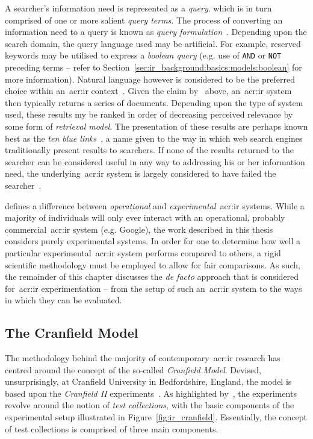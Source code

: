 A searcher's information need is represented as a \emph{query}. which is in turn comprised of one or more salient \emph{query terms}. The process of converting an information need to a query is known as \emph{query formulation}~\citep{hiemstra2009ir_models}. Depending upon the search domain, the query language used may be artificial. For example, reserved keywords may be utilised to express a \emph{boolean query} (e.g. use of \texttt{AND} or \texttt{NOT} preceding terms -- refer to Section~\ref{sec:ir_background:basics:models:boolean} for more information). Natural language however is considered to be the preferred choice within an~\gls{acr:ir} context~\citep{rijsbergen1979ir}. Given the claim by~\cite{robertson1977prp} above, an~\gls{acr:ir} system then typically returns a series of documents. Depending upon the type of system used, these results my be ranked in order of decreasing perceived relevance by some form of \emph{retrieval model}. The presentation of these results are perhaps known best as the \emph{ten blue links}~\citep{hearst2009_search}, a name given to the way in which web search engines traditionally present results to searchers. If none of the results returned to the searcher can be considered useful in any way to addressing his or her information need, the underlying~\gls{acr:ir} system is largely considered to have failed the searcher~\citep{rijsbergen1979ir}.

\cite{rijsbergen1979ir} defines a difference between \emph{operational} and \emph{experimental}~\gls{acr:ir} systems. While a majority of individuals will only ever interact with an operational, probably commercial~\gls{acr:ir} system (e.g. Google), the work described in this thesis considers purely experimental systems. In order for one to determine how well a particular experimental~\gls{acr:ir} system performs compared to others, a rigid scientific methodology must be employed to allow for fair comparisons. As such, the remainder of this chapter discusses the \emph{de facto} approach that is considered for~\gls{acr:ir} experimentation -- from the setup of such an~\gls{acr:ir} system to the ways in which they can be evaluated.

\subsection{The Cranfield Model}\label{sec:ir_background:basics:cranfield}
The methodology behind the majority of contemporary~\gls{acr:ir} research has centred around the concept of the so-called \emph{Cranfield Model}. Devised, unsurprisingly, at Cranfield University in Bedfordshire, England, the model is based upon the \emph{Cranfield II} experiments~\citep{aslib1966factors}. As highlighted by~\cite{borlund2003iir_model}, the experiments revolve around the notion of \emph{test collections}, with the basic components of the experimental setup illustrated in Figure~\ref{fig:ir_cranfield}. Essentially, the concept of test collections is comprised of three main components.

